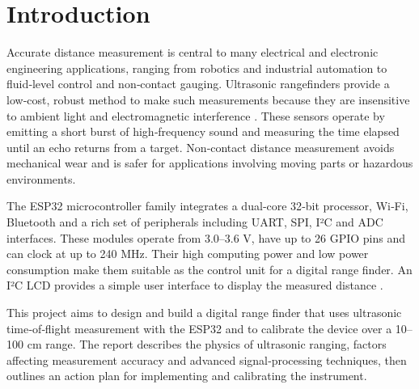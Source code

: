 \section{Introduction}
Accurate distance measurement is central to many electrical and electronic engineering applications, ranging from robotics and industrial automation to fluid‑level control and non‑contact gauging. Ultrasonic rangefinders provide a low‑cost, robust method to make such measurements because they are insensitive to ambient light and electromagnetic interference \cite{mi13040520}.  These sensors operate by emitting a short burst of high‑frequency sound and measuring the time elapsed until an echo returns from a target. Non‑contact distance measurement avoids mechanical wear and is safer for applications involving moving parts or hazardous environments.

The ESP32 microcontroller family integrates a dual‑core 32‑bit processor, Wi‑Fi, Bluetooth and a rich set of peripherals including UART, SPI, I²C and ADC interfaces. These modules operate from 3.0–3.6 V, have up to 26 GPIO pins and can clock at up to 240 MHz. Their high computing power and low power consumption make them suitable as the control unit for a digital range finder. An I²C LCD provides a simple user interface to display the measured distance \cite{esp32_datasheet}.

This project aims to design and build a digital range finder that uses ultrasonic time‑of‑flight measurement with the ESP32 and to calibrate the device over a 10–100 cm range. The report describes the physics of ultrasonic ranging, factors affecting measurement accuracy and advanced signal‑processing techniques, then outlines an action plan for implementing and calibrating the instrument.